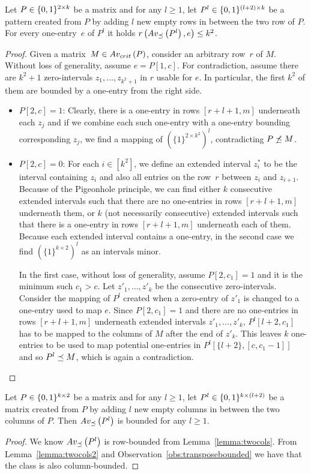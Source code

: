 \begin{lemma}
\label{lemma:twocols2}
Let $P\in\{0,1\}^{2\times k}$ be a matrix and for any $l\geq1$, let $P^l\in\{0,1\}^{(l+2)\times k}$ be a pattern created from $P$ by adding $l$ new empty rows in between the two row of $P$. For every one-entry~$e$ of $P^l$ it holds $r\left(Av_{\preceq}\left(P^l\right),e\right)\leq k^2$.
\end{lemma}
\begin{proof}
Given a matrix~$M\in Av_{crit}\left(P\right)$, consider an arbitrary row~$r$ of $M$. Without loss of generality, assume $e=P[1,c]$. For contradiction, assume there are $k^2+1$ zero-intervals $z_1,\dots,z_{k^2+1}$ in $r$ usable for $e$. In particular, the first $k^2$ of them are bounded by a one-entry from the right side.
\begin{itemize}
	\item $P[2,c]=1$: Clearly, there is a one-entry in rows $[r+l+1,m]$ underneath each $z_j$ and if we combine each such one-entry with a one-entry bounding corresponding $z_j$, we find a mapping of $\left(\{1\}^{2\times k^2}\right)^l$, contradicting $P\not\preceq M$.
	\item $P[2,c]=0$: For each $i\in[k^2]$, we define an extended interval $z^*_i$ to be the interval containing $z_i$ and also all entries on the row~$r$ between $z_i$ and $z_{i+1}$. Because of the Pigeonhole principle, we can find either $k$ consecutive extended intervals such that there are no one-entries in rows $[r+l+1,m]$ underneath them, or $k$ (not necessarily consecutive) extended intervals such that there is a one-entry in rows $[r+l+1,m]$ underneath each of them. Because each extended interval contains a one-entry, in the second case we find $\left(\{1\}^{k\times2}\right)^l$ as an intervals minor.
	
	In the first case, without loss of generality, assume $P[2,c_1]=1$ and it is the minimum such $c_1>c$. Let $z'_1,\dots,z'_k$ be the consecutive zero-intervals. Consider the mapping of $P^l$ created when a zero-entry of $z'_1$ is changed to a one-entry used to map $e$. Since $P[2,c_1]=1$ and there are no one-entries in rows $[r+l+1,m]$ underneath extended intervals $z'_1,\dots,z'_k$, $P^l[l+2,c_1]$ has to be mapped to the columns of $M$ after the end of $z'_k$. This leaves $k$ one-entries to be used to map potential one-entries in $P^l[\{l+2\},[c,c_1-1]]$ and so $P^l\preceq M$, which is again a contradiction.
\end{itemize}
\end{proof}

\begin{cor}
\label{cor:twocols}
Let $P\in\{0,1\}^{k\times2}$ be a matrix and for any $l\geq1$, let $P^l\in\{0,1\}^{k\times(l+2)}$ be a matrix created from $P$ by adding $l$ new empty columns in between the two columns of $P$. Then $Av_{\preceq}\left(P^l\right)$ is bounded for any $l\geq1$.
\end{cor}
\begin{proof}
We know $Av_{\preceq}\left(P^l\right)$ is row-bounded from Lemma~\ref{lemma:twocols}. From Lemma~\ref{lemma:twocols2} and Observation~\ref{obs:transposebounded} we have that the class is also column-bounded.
\end{proof}


